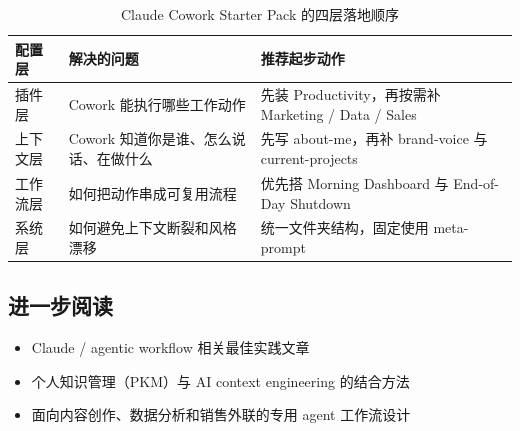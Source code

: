 \begin{table}[H]
\centering
\begin{tabular}{p{} p{} p{}}
\toprule
配置层 & 解决的问题 & 推荐起步动作 \\
\midrule
插件层 & Cowork 能执行哪些工作动作 & 先装 Productivity，再按需补 Marketing / Data / Sales \\
上下文层 & Cowork 知道你是谁、怎么说话、在做什么 & 先写 about-me，再补 brand-voice 与 current-projects \\
工作流层 & 如何把动作串成可复用流程 & 优先搭 Morning Dashboard 与 End-of-Day Shutdown \\
系统层 & 如何避免上下文断裂和风格漂移 & 统一文件夹结构，固定使用 meta-prompt \\
\bottomrule
\end{tabular}
\caption{Claude Cowork Starter Pack 的四层落地顺序}
\end{table}

\subsection{进一步阅读}

\begin{itemize}
    \item Claude / agentic workflow 相关最佳实践文章
    \item 个人知识管理（PKM）与 AI context engineering 的结合方法
    \item 面向内容创作、数据分析和销售外联的专用 agent 工作流设计
\end{itemize}



